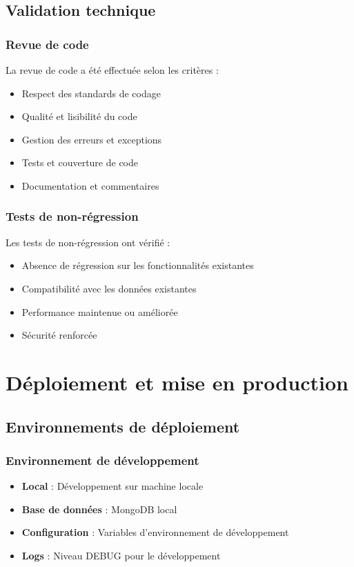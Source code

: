 \subsection{Validation technique}
\subsubsection{Revue de code}
La revue de code a été effectuée selon les critères :
\begin{itemize}
    \item Respect des standards de codage
    \item Qualité et lisibilité du code
    \item Gestion des erreurs et exceptions
    \item Tests et couverture de code
    \item Documentation et commentaires
\end{itemize}

\subsubsection{Tests de non-régression}
Les tests de non-régression ont vérifié :
\begin{itemize}
    \item Absence de régression sur les fonctionnalités existantes
    \item Compatibilité avec les données existantes
    \item Performance maintenue ou améliorée
    \item Sécurité renforcée
\end{itemize}

\section{Déploiement et mise en production}
\subsection{Environnements de déploiement}
\subsubsection{Environnement de développement}
\begin{itemize}
    \item \textbf{Local} : Développement sur machine locale
    \item \textbf{Base de données} : MongoDB local
    \item \textbf{Configuration} : Variables d'environnement de développement
    \item \textbf{Logs} : Niveau DEBUG pour le développement
\end{itemize}


